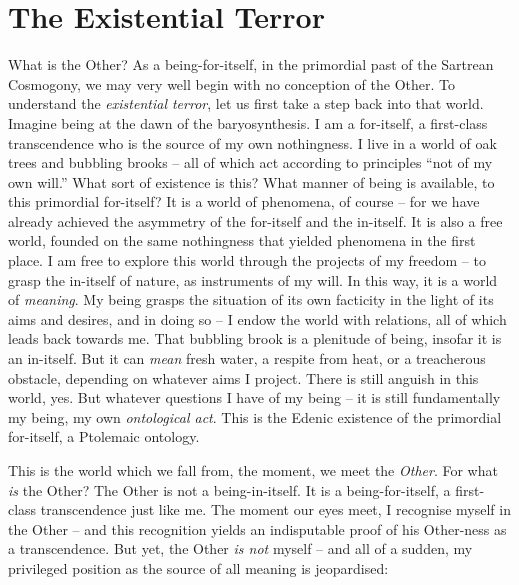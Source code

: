 \section{The Existential Terror}

What is the Other? As a being-for-itself, in the primordial past of the Sartrean Cosmogony, we may very well begin with no conception of the Other. To understand the \emph{existential terror}, let us first take a step back into that world. 
Imagine being at the dawn of the baryosynthesis. I am a for-itself, a first-class transcendence who is the source of my own nothingness. I live in a world of oak trees and bubbling brooks -- all of which act according to principles \enquote{not of my own will.} What sort of existence is this? What manner of being is available, to this primordial for-itself? It is a world of phenomena, of course -- for we have already achieved the asymmetry of the for-itself and the in-itself. It is also a free world, founded on the same nothingness that yielded phenomena in the first place. I am free to explore this world through the projects of my freedom -- to grasp the in-itself of nature, as instruments of my will. In this way, it is a world of \emph{meaning}. My being grasps the situation of its own facticity in the light of its aims and desires, and in doing so -- I endow the world with relations, all of which leads back towards me. That bubbling brook is a plenitude of being, insofar it is an in-itself. But it can \emph{mean} fresh water, a respite from heat, or a treacherous obstacle, depending on whatever aims I project. There is still anguish in this world, yes. But whatever questions I have of my being -- it is still fundamentally my being, my own \emph{ontological act}. This is the Edenic existence of the primordial for-itself, a Ptolemaic ontology.

This is the world which we fall from, the moment, we meet the \emph{Other}. For what \emph{is} the Other? The Other is not a being-in-itself. It is a being-for-itself, a first-class transcendence just like me. The moment our eyes meet, I recognise myself in the Other -- and this recognition yields an indisputable proof of his Other-ness as a transcendence.  But yet, the Other \emph{is not} myself -- and all of a sudden, my privileged position as the source of all meaning is jeopardised: 

